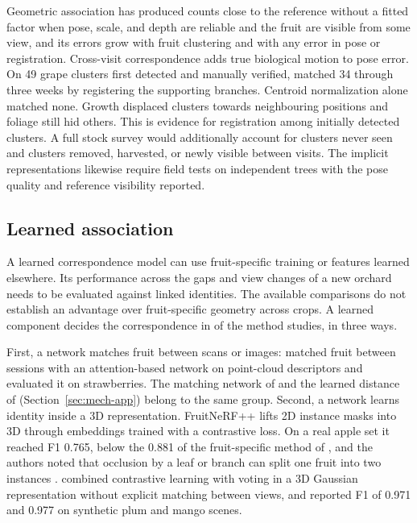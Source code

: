 Geometric association has produced counts close to the reference without a fitted factor when pose, scale, and depth are reliable and the fruit are visible from some view, and its errors grow with fruit clustering and with any error in pose or registration. Cross-visit correspondence adds true biological motion to pose error. On 49 grape clusters first detected and manually verified, \citet{yoshida2026cross} matched 34 through three weeks by registering the supporting branches. Centroid normalization alone matched none. Growth displaced clusters towards neighbouring positions and foliage still hid others. This is evidence for registration among initially detected clusters. A full stock survey would additionally account for clusters never seen and clusters removed, harvested, or newly visible between visits. The implicit representations likewise require field tests on independent trees with the pose quality and reference visibility reported.

\subsection{Learned association}\label{sec:mech-learn}
A learned correspondence model can use fruit-specific training or features learned elsewhere. Its performance across the gaps and view changes of a new orchard needs to be evaluated against linked identities. The available comparisons do not establish an advantage over fruit-specific geometry across crops. A learned component decides the correspondence in \nLearn of the \nMethod method studies, in three ways.

First, a network matches fruit between scans or images: \citet{fusaro2026horticultural} matched fruit between sessions with an attention-based network on point-cloud descriptors and evaluated it on strawberries. The matching network of \citet{xia2022culling} and the learned distance of \citet{zheng2023object} (Section~\ref{sec:mech-app}) belong to the same group. Second, a network learns identity inside a 3D representation. FruitNeRF++ lifts 2D instance masks into 3D through embeddings trained with a contrastive loss. On a real apple set it reached F1 0.765, below the 0.881 of the fruit-specific method of \citet{genemola2020fruitb}, and the authors noted that occlusion by a leaf or branch can split one fruit into two instances \citep{meyer2025fruitnerf}. \citet{zhao2026adapting} combined contrastive learning with voting in a 3D Gaussian representation without explicit matching between views, and reported F1 of 0.971 and 0.977 on synthetic plum and mango scenes.

